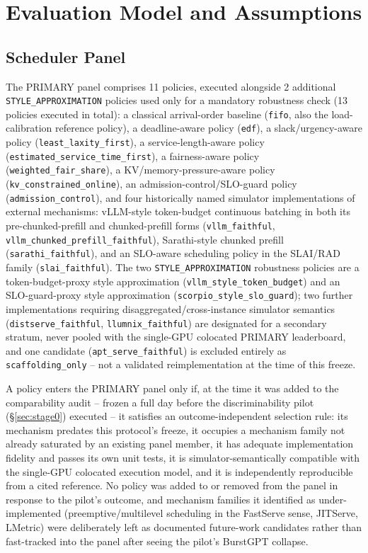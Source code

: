 \section{Evaluation Model and Assumptions}\label{sec:methodology}
\subsection{Scheduler Panel}
\label{sec:panel}

The PRIMARY panel comprises 11 policies, executed alongside 2 additional
\texttt{STYLE\_APPROXIMATION} policies used only for a mandatory robustness
check (13 policies executed in total): a classical arrival-order baseline
(\texttt{fifo}, also the load-calibration reference policy), a
deadline-aware policy (\texttt{edf}), a slack/urgency-aware policy
(\texttt{least\_laxity\_first}), a service-length-aware policy
(\texttt{estimated\_service\_time\_first}), a fairness-aware policy
(\texttt{weighted\_fair\_share}), a KV/memory-pressure-aware policy
(\texttt{kv\_constrained\_online}), an admission-control/SLO-guard policy
(\texttt{admission\_control}), and four historically named simulator implementations of
external mechanisms: vLLM-style token-budget continuous batching in both
its pre-chunked-prefill and chunked-prefill forms
(\texttt{vllm\_faithful}, \texttt{vllm\_chunked\_prefill\_faithful}),
Sarathi-style chunked prefill (\texttt{sarathi\_faithful}), and an
SLO-aware scheduling policy in the SLAI/RAD family
(\texttt{slai\_faithful}). The two \texttt{STYLE\_APPROXIMATION} robustness
policies are a token-budget-proxy style approximation
(\texttt{vllm\_style\_token\_budget}) and an SLO-guard-proxy style
approximation (\texttt{scorpio\_style\_slo\_guard}); two further implementations requiring disaggregated/cross-instance simulator
semantics (\texttt{distserve\_faithful}, \texttt{llumnix\_faithful}) are
designated for a secondary stratum, never pooled with the single-GPU
colocated PRIMARY leaderboard, and one candidate
(\texttt{apt\_serve\_faithful}) is excluded entirely as
\texttt{scaffolding\_only} -- not a validated reimplementation at the time
of this freeze.

A policy enters the PRIMARY panel only if, at the time it was added to the
comparability audit -- frozen a full day before the discriminability
pilot (\S\ref{sec:stage0}) executed -- it satisfies an outcome-independent
selection rule: its mechanism predates this protocol's freeze, it
occupies a mechanism family not already saturated by an existing panel
member, it has adequate implementation fidelity and passes its own unit
tests, it is simulator-semantically compatible with the single-GPU
colocated execution model, and it is independently reproducible from a
cited reference. No policy was added to or removed from the panel in
response to the pilot's outcome, and mechanism families it identified as
under-implemented (preemptive/multilevel scheduling in the FastServe
sense, JITServe, LMetric) were deliberately left as documented future-work
candidates rather than fast-tracked into the panel after seeing the
pilot's BurstGPT collapse.

